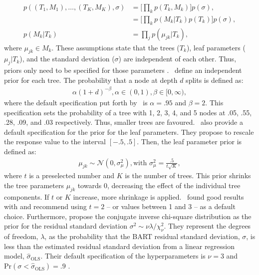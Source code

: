 \documentclass[10pt, a4paper, titlepage]{article}
\begin{document}
\begin{subequations}
\begin{align}
\label{eq:independence_prior}
    p((T_1, M_1), \dots, (T_K, M_K), \sigma) &= \Big[\prod_{k}p(T_k, M_k)\Big]p(\sigma), \\
    &= \Big[\prod_{k}p(M_k|T_k)p(T_k)\Big]p(\sigma), \\
    p(M_k|T_k) &= \prod_{j}p(\mu_{jk}|T_k),
\end{align}
\end{subequations} where $\mu_{jk} \in M_k$. These assumptions state that the trees ($T_{k}$), leaf parameters ($\mu_{j}|T_{k}$), and the standard deviation ($\sigma$) are independent of each other. Thus, priors only need to be specified for those parameters \citep{chipman2010, hill2020, chipman2006, chipman1998}.~\citet{chipman1998} define an independent prior for each tree. The probability that a node at depth $d$ splits is defined as: 
\begin{align}
\label{eq:tree_prior}
    \alpha(1+d)^{-\beta}, \alpha \in (0,1), \beta \in [0, \infty),
\end{align} where the default specification put forth by~\citet{chipman2006,chipman2010} is $\alpha = .95$ and $\beta = 2$. This specification sets the probability of a tree with 1, 2, 3, 4, and 5 nodes at .05, .55, .28, .09, and .03 respectively. Thus, smaller trees are favoured.~\citet{chipman2006,chipman2010} also provide a default specification for the prior for the leaf parameters. They propose to rescale the response value to the interval $[-.5,.5]$. Then, the leaf parameter prior is defined as: 
\begin{align}
\label{eq:leaf_prior}
    \mu_{jk} \sim \mathcal{N}(0, \sigma^2_{\mu}), \text{with } \sigma^2_{\mu} = \frac{.5}{t\sqrt{K}},
\end{align} where $t$ is a preselected number and $K$ is the number of trees. This prior shrinks the tree parameters $\mu_{jk}$ towards 0, decreasing the effect of the individual tree components. If $t$ or $K$ increase, more shrinkage is applied.~\citet{chipman2006,chipman2010} found good results with and recommend using $t = 2$ -- or values between 1 and 3 -- as a default choice. Furthermore, \citet{chipman2006,chipman2010} propose the conjugate inverse chi-square distribution as the prior for the residual standard deviation $\sigma^2 \sim \nu\lambda/\chi^{2}_{\nu}$. They represent the degrees of freedom, $\lambda$, as the probability that the BART residual standard deviation, $\sigma$, is less than the estimated residual standard deviation from a linear regression model, $\hat{\sigma}_\text{OLS}$. Their default specification of the hyperparameters is $\nu = 3$ and $\text{Pr}(\sigma < \hat{\sigma}_\text{OLS}) = .9$ \citep{chipman2010, hill2020, chipman2006, chipman1998}.
\end{document}

